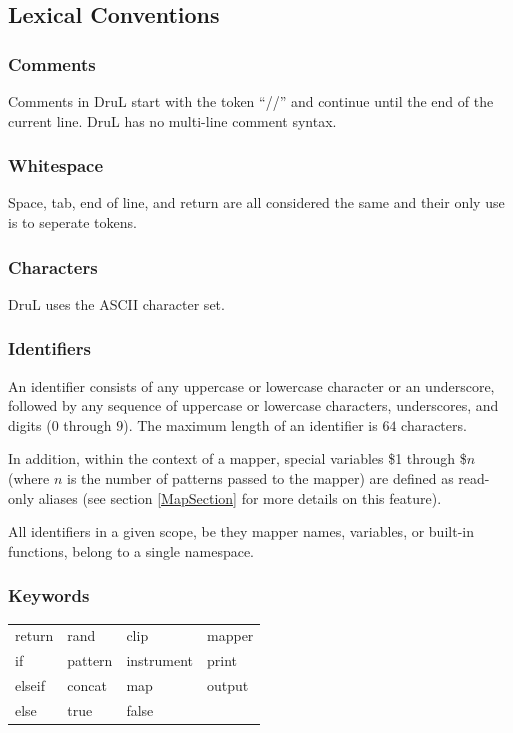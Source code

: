 \documentclass[11pt,twoside]{article}
\begin{document}
\subsection{Lexical Conventions}

\subsubsection{Comments}

Comments in DruL start with the token ``//'' and continue until the end of the current line.
DruL has no multi-line comment syntax.

\subsubsection{Whitespace}

Space, tab, end of line, and return are all considered the same 
and their only use is to seperate tokens.

\subsubsection{Characters}

DruL uses the ASCII character set.

\subsubsection{Identifiers}

An identifier consists of any uppercase or lowercase character
or an underscore, followed by any sequence of uppercase or lowercase characters,
underscores, and digits ($0$ through $9$). The maximum length of an identifier
is $64$ characters.

In addition, within the context of a mapper, special variables \$1 through \$$n$ (where $n$ is the number of patterns passed to the mapper) are defined as read-only aliases (see section \ref{MapSection} for more details on this feature).

All identifiers in a given scope, be they mapper names, variables, or built-in functions, belong to a single namespace.

\subsubsection{Keywords}

\begin{table}[htb]
\begin{center} 
\begin{tabular}{llll} 
  return   & rand    & clip       & mapper \\
  if     & pattern & instrument & print  \\
  elseif & concat  & map     & output \\
  else   & true    & false &
\end{tabular}
\label{tab:keywords}
\end{center} 
\end{table}
\end{document}
